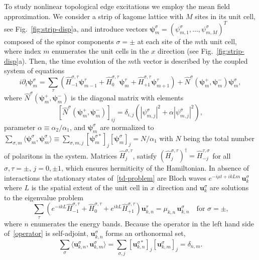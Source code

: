 \documentclass[
aps,
prl,
groupedaddress,
superscriptaddress,
floatfix,
notitlepage
]{revtex4-1}
\newcommand{\p}{\partial}
\begin{document}
To study nonlinear topological edge excitations we employ the mean field approximation. We consider a strip of kagome lattice with $M$ sites in its unit cell, see Fig.~\ref{fig:strip-disp}a, and introduce vectors $\pmb{\psi}_m^{\sigma}=(\psi_{m,1}^{\sigma},...,\psi_{m,M}^{\sigma})^T$ composed of the spinor components $\sigma=\pm$ at each site of the $m$th unit cell, where index $m$ enumerates the unit cells in the $x$ direction (see Fig.~\ref{fig:strip-disp}a). 
Then, the time evolution of the $m$th vector is described by
the coupled system of equations
\begin{equation}
i\p_t\pmb{\psi}_m^{\sigma}=\sum_{\tau}\left(\hat H_{-1}^{\sigma,\tau}\pmb{\psi}_{m-1}^{\tau}+\hat H_0^{\sigma,\tau}\pmb{\psi}_m^{\tau}+\hat H_{+1}^{\sigma,\tau}\pmb{\psi}_{m+1}^{\tau}\right)+ \hat{N}^{\sigma}(\pmb{\psi}_m^{+},\pmb{\psi}_m^{-}) \pmb{\psi}_m^{\sigma},
\label{td-problem}
\end{equation} 
where $\hat{N}^{\sigma}(\pmb{\psi}_m^{+},\pmb{\psi}_m^{-})$ is the diagonal matrix with elements
$$\left[\hat{N}^{\sigma}(\pmb{\psi}_m^{+},\pmb{\psi}_m^{-})\right]_{ij} = \delta_{i,j}\left(|\psi_{m,j}^{\sigma}|^2 + \alpha |\psi_{m,j}^{\bar\sigma}|^2\right),$$
parameter $\alpha\equiv \alpha_2/\alpha_1$, and 
$\pmb{\psi}_m^{\sigma}$ are normalized to $\sum_{\sigma,m}\langle\pmb{\psi}_m^{\sigma},\pmb{\psi}_m^{\sigma}\rangle \equiv \sum_{\sigma,m,j}[\pmb{\psi}_m^{\sigma*}]_j [\pmb{\psi}_m^{\sigma}]_j=N/\alpha_1$ 
with $N$ being the total number of polaritons in the system.
Matrices $\hat H_{j}^{\sigma,\tau}$, satisfy $(\hat H_{j}^{\sigma,\tau})^\dagger=\hat H_{-j}^{\tau,\sigma}$
for all $\sigma,\tau=\pm$, $j=0,\pm1$, which ensures hermiticity of the Hamiltonian.
In absence of interactions the stationary states of~\eqref{td-problem} are Bloch waves $e^{-i\mu t+ikLm}\,\pmb{u}_{k}^{\sigma}$ where $L$ is the spatial extent of the unit cell in $x$ direction and $\pmb{u}_{k}^{\sigma}$ are %
solutions to the eigenvalue problem
\begin{equation}
\sum_{\tau}\left(e^{-ikL} \hat H_{-1}^{\sigma,\tau}+\hat H_0^{\sigma,\tau}+e^{ikL} \hat H_{+1}^{\sigma,\tau}\right) \pmb{u}_{k,n}^{\tau}=\mu_{k,n}\,\pmb{u}_{k,n}^{\sigma}
\quad\text{for $\sigma=\pm$,}
\label{operator}
\end{equation}
where $n$ enumerates the energy bands. Because the operator in the left hand side of~\eqref{operator} is self-adjoint, $\pmb{u}_{k,n}^{\sigma}$ forms an orthonormal set, 
$$
\sum_\sigma\langle\pmb{u}_{k,n}^{\sigma},\pmb{u}_{k,m}^{\sigma}\rangle 
=\sum_{\sigma,j}[\pmb{u}_{k,n}^{\sigma*}]_j[\pmb{u}_{k,m}^{\sigma}]_j=\delta_{n,m}.
$$
\end{document}

